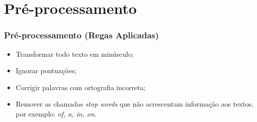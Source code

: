 \section[Pré-processamento]{Pré-processamento}

\begin{frame}
  \frametitle{Pré-processamento (Regas Aplicadas)}
  \begin{itemize}
    \item Transformar todo texto em minúsculo;
    \item Ignorar pontuações;
    \item Corrigir palavras com ortografia incorreta;
    \item Remover as chamadas \textit{stop words} que não acrescentam informação aos textos, por exemplo: \textit{of, a, in, on}.
  \end{itemize}
\end{frame}